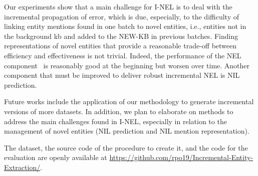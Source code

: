 Our experiments show that a main challenge for I-NEL is to deal with the incremental propagation of error, which is due, especially, to the difficulty of linking entity mentions found in one batch to novel entities, i.e., entities not in the background \ac{kb} and added to the NEW-KB in previous batches. 
Finding representations of novel entities that provide a reasonable trade-off between efficiency and effectiveness is not trivial.
Indeed, the performance of the NEL component~\cite{blink} is reasonably good at the beginning but worsen over time. Another component that must be improved to deliver robust incremental NEL is NIL prediction.      

Future works include the application of our methodology to generate incremental versions of more datasets. In addition, we plan to elaborate on methods to address the main challenges found in I-NEL, especially in relation to the management of novel entities (NIL prediction and NIL mention representation).  

The dataset, the source code of the procedure to create it, and the code for the evaluation are openly available at \url{https://github.com/rpo19/Incremental-Entity-Extraction/}.